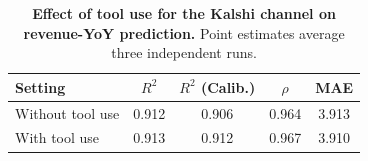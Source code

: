\begin{table}[t]
\centering
\caption{\textbf{Effect of tool use for the Kalshi channel on revenue-YoY prediction.}
Point estimates average three independent runs.}
\label{tab:kalshi_tool_use}
\begin{tabular}{lcccc}
\toprule
Setting & $R^2$ & $R^2$ (Calib.) & $\rho$ & MAE \\
\midrule
Without tool use & 0.912 & 0.906 & 0.964 & 3.913 \\
With tool use & 0.913 & 0.912 & 0.967 & 3.910 \\
\bottomrule
\end{tabular}
\end{table}
